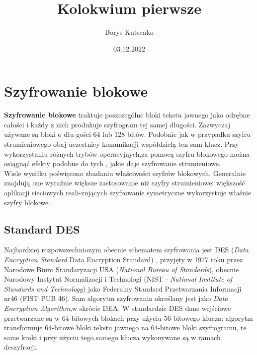 \documentclass[12pt, letterpaper, titlepage]{article}
\title{Kolokwium pierwsze}
\author{Borys Kutsenko}
\date{03.12.2022}
\begin{document}
\maketitle
\section{Szyfrowanie blokowe}
\textbf{Szyfrowanie blokowe} \cite{some} traktuje poszczególne bloki tekstu jawnego jako odrębne całości i każdy z nich produkuje szyfrogram tej samej długości. Zazwyczaj używane są bloki o dłu-gości 64 lub 128 bitów. Podobnie jak w przypadku szyfru strumieniowego obaj uczestnicy komunikacji współdzielą ten sam klucz. Przy wykorzystaniu różnych trybów operacyjnych,za pomocą szyfru blokowego można osiągnąć efekty podobne do tych , jakie daje szyfrowanie strumieniowe. \\ Wiele wysiłku poświęcono zbadaniu właściwości szyfrów blokowych. Generalnie znajdują one wyraźnie większe zastosowanie niż szyfry strumieniowe: większość aplikacji sieciowych reali-zujących szyfrowanie symetryczne wykorzystuje właśnie szyfry blokowe.
\subsection{Standard DES}
Najbardziej rozpowszechnionym obecnie schematem szyfrowania jest DES (\textit{Data Encryption Standard} Data Encryption Standard) \cite{bas} , przyjęty w 1977 roku przez Narodowe Biuro Standaryzacji USA (\textit{National Bureau of Standards}), obecnie Narodowy Instytut Normalizacji i Technologi (NIST - \textit{National Institute of Standards and Technology}) jako Federalny Standard Przetwarzania Informacji nr46 (FIST PUB 46). Sam algorytm szyfrowania określany jest jako \textit{Data Encryption Algorithm},w skrócie DEA. W standardzie DES dane wejściowe przetwarzane są w 64-bitowych blokach przy użyciu 56-bitowego klucza: algorytm transformuje 64-bitowe bloki tekstu jawnego na 64-bitowe bloki szyfrogramu, te same kroki i przy użyciu tego samego klucza wykonywane są w ramach deszyfracji.
\end{document}
